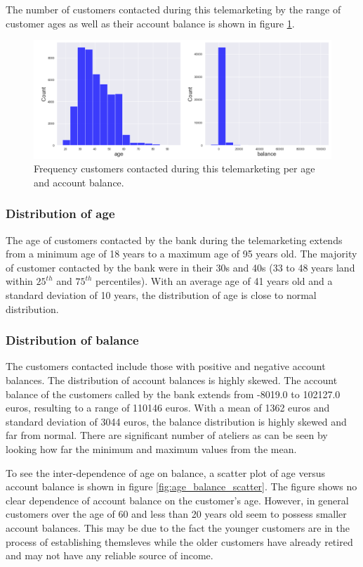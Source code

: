 The number of customers contacted during this telemarketing by the range of customer ages as well as their account balance is shown in figure \ref{fig:age_balance_count}.

\begin{figure}[tbh]
\centering
\includegraphics[width = 0.7\hsize]{./resources/img/fig_age_balance_count.png}
\caption{Frequency customers contacted during this telemarketing per age and account balance.} 
\label{fig:age_balance_count}
\end{figure}

\subsubsection*{Distribution of age}
The age of customers contacted by the bank during the telemarketing extends from a minimum age of 18 years to a maximum age of 95 years old. The majority of customer contacted by the bank were in their 30s and 40s (33 to 48 years land within $25^{th}$ and $75^{th}$ percentiles). With an average age of 41 years old and a standard deviation of 10 years, the distribution of age is close to normal distribution.

\subsubsection{Distribution of balance}
The customers contacted include those with positive and negative account balances. The distribution of account balances is highly skewed. The account balance of the customers called by the bank extends from -8019.0 to 102127.0 euros, resulting to a range of 110146 euros. With a mean of 1362 euros and standard deviation of 3044 euros, the balance distribution is highly skewed and far from normal. There are significant number of ateliers as can be seen by looking how far the minimum and maximum values from the mean. 

To see the inter-dependence of age on balance, a scatter plot of age versus account balance is shown in figure \ref{fig:age_balance_scatter}. The figure shows no clear dependence of account balance on the customer's age. However, in general customers over the age of 60 and less than 20 years old seem to possess smaller account balances. This may be due to the fact the younger customers are in the process of establishing themsleves while the older customers have already retired and may not have any reliable source of income.


